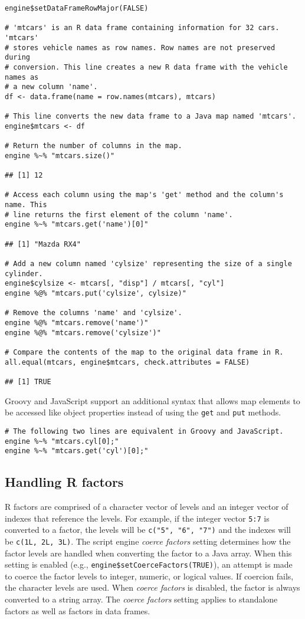 \documentclass[
article,
11pt, %
a4paper, %
oneside, %
headinclude,footinclude, %
]{scrartcl}
\theoremstyle{definition} %
\theoremstyle{plain} %
\theoremstyle{remark} %
\newcommand{\code}[1]{\texttt{#1}}
\begin{document}
\begin{verbatim}
engine$setDataFrameRowMajor(FALSE)

# 'mtcars' is an R data frame containing information for 32 cars. 'mtcars'
# stores vehicle names as row names. Row names are not preserved during
# conversion. This line creates a new R data frame with the vehicle names as
# a new column 'name'.
df <- data.frame(name = row.names(mtcars), mtcars)

# This line converts the new data frame to a Java map named 'mtcars'.
engine$mtcars <- df

# Return the number of columns in the map.
engine %~% "mtcars.size()"

## [1] 12

# Access each column using the map's 'get' method and the column's name. This
# line returns the first element of the column 'name'.
engine %~% "mtcars.get('name')[0]"

## [1] "Mazda RX4"

# Add a new column named 'cylsize' representing the size of a single cylinder.
engine$cylsize <- mtcars[, "disp"] / mtcars[, "cyl"]
engine %@% "mtcars.put('cylsize', cylsize)"

# Remove the columns 'name' and 'cylsize'.
engine %@% "mtcars.remove('name')"
engine %@% "mtcars.remove('cylsize')"

# Compare the contents of the map to the original data frame in R.
all.equal(mtcars, engine$mtcars, check.attributes = FALSE)

## [1] TRUE
\end{verbatim}

Groovy and JavaScript support an additional syntax that allows map elements to be accessed like object properties instead of using the \code{get} and \code{put} methods.

\begin{verbatim}
# The following two lines are equivalent in Groovy and JavaScript.
engine %~% "mtcars.cyl[0];"
engine %~% "mtcars.get('cyl')[0];"
\end{verbatim}

\subsection{Handling R factors}

R factors are comprised of a character vector of levels and an integer vector of indexes that reference the levels. For example, if the integer vector \code{5:7} is converted to a factor, the levels will be \code{c("5", "6", "7")} and the indexes will be \code{c(1L, 2L, 3L)}. The script engine \textit{coerce factors} setting determines how the factor levels are handled when converting the factor to a Java array. When this setting is enabled (e.g., \code{engine\$setCoerceFactors(TRUE)}), an attempt is made to coerce the factor levels to integer, numeric, or logical values. If coercion fails, the character levels are used. When \textit{coerce factors} is disabled, the factor is always converted to a string array. The \textit{coerce factors} setting applies to standalone factors as well as factors in data frames.
\end{document}
